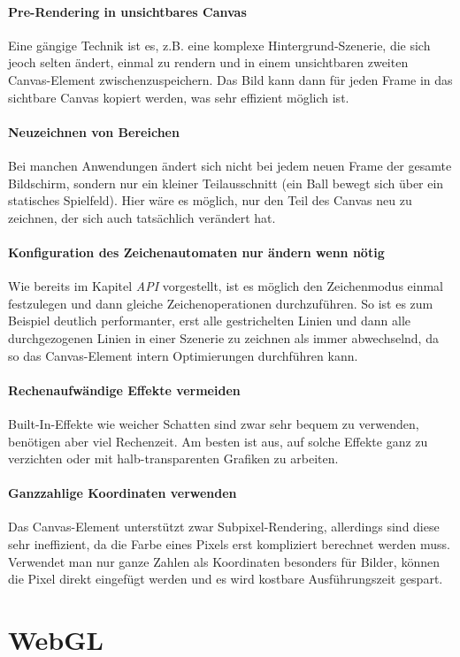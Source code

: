 \documentclass[a4paper, 12pt]{article}
\begin{document}
\paragraph{Pre-Rendering in unsichtbares Canvas} Eine gängige Technik ist es, z.B. eine komplexe Hintergrund-Szenerie, die sich jeoch selten ändert, einmal zu rendern und in einem unsichtbaren zweiten Canvas-Element zwischenzuspeichern. Das Bild kann dann für jeden Frame in das sichtbare Canvas kopiert werden, was sehr effizient möglich ist.
\paragraph{Neuzeichnen von Bereichen} Bei manchen Anwendungen ändert sich nicht bei jedem neuen Frame der gesamte Bildschirm, sondern nur ein kleiner Teilausschnitt (ein Ball bewegt sich über ein statisches Spielfeld). Hier wäre es möglich, nur den Teil des Canvas neu zu zeichnen, der sich auch tatsächlich verändert hat.
\paragraph{Konfiguration des Zeichenautomaten nur ändern wenn nötig} Wie bereits im Kapitel \emph{API} vorgestellt, ist es möglich den Zeichenmodus einmal festzulegen und dann gleiche Zeichenoperationen durchzuführen. So ist es zum Beispiel deutlich performanter, erst alle gestrichelten Linien und dann alle durchgezogenen Linien in einer Szenerie zu zeichnen als immer abwechselnd, da so das Canvas-Element intern Optimierungen durchführen kann.
\paragraph{Rechenaufwändige Effekte vermeiden} Built-In-Effekte wie weicher Schatten sind zwar sehr bequem zu verwenden, benötigen aber viel Rechenzeit. Am besten ist aus, auf solche Effekte ganz zu verzichten oder mit halb-transparenten Grafiken zu arbeiten.
\paragraph{Ganzzahlige Koordinaten verwenden} Das Canvas-Element unterstützt zwar Subpixel-Rendering, allerdings sind diese sehr ineffizient, da die Farbe eines Pixels erst kompliziert berechnet werden muss. Verwendet man nur ganze Zahlen als Koordinaten besonders für Bilder, können die Pixel direkt eingefügt werden und es wird kostbare Ausführungszeit gespart.
\section{WebGL}
\end{document}
